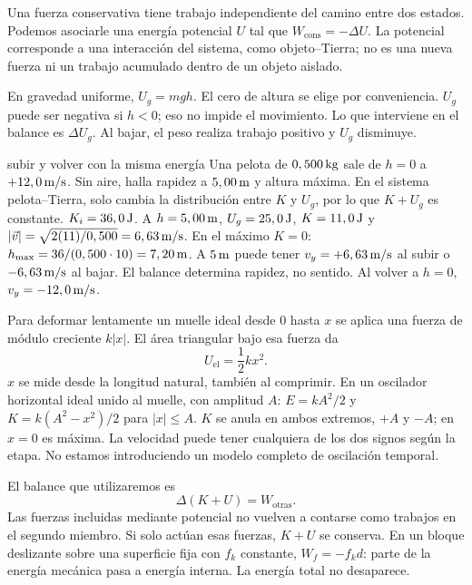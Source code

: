\documentclass[11pt,a4paper]{article}
\begin{document}
Una fuerza conservativa tiene trabajo independiente del camino entre dos estados.
Podemos asociarle una energ\'ia potencial $U$ tal que $W_{\mathrm{cons}}=-\Delta U$.
La potencial corresponde a una interacci\'on del sistema, como objeto--Tierra;
no es una nueva fuerza ni un trabajo acumulado dentro de un objeto aislado.

En gravedad uniforme, $U_g=mgh$. El cero de altura se elige por conveniencia.
$U_g$ puede ser negativa si $h<0$; eso no impide el movimiento.
Lo que interviene en el balance es $\Delta U_g$.
Al bajar, el peso realiza trabajo positivo y $U_g$ disminuye.

\begin{examplebox}{subir y volver con la misma energ\'ia}
 Una pelota de $0,500\,\mathrm{kg}$ sale de $h=0$ a $+12,0\,\mathrm{m/s}$.
Sin aire, halla rapidez a $5,00\,\mathrm{m}$ y altura m\'axima.
\solutionblock
{} En el sistema pelota--Tierra, solo cambia la distribuci\'on
entre $K$ y $U_g$, por lo que $K+U_g$ es constante.
 $K_i=36,0\,\mathrm{J}$.
A $h=5,00\,\mathrm{m}$, $U_g=25,0\,\mathrm{J}$, $K=11,0\,\mathrm{J}$ y
$|\vec v|=\sqrt{2(11)/0,500}=6,63\,\mathrm{m/s}$.
En el m\'aximo $K=0$: $h_{\max}=36/(0,500\cdot10)=7,20\,\mathrm{m}$.
 A $5\,\mathrm{m}$ puede tener $v_y=+6,63\,\mathrm{m/s}$ al subir
o $-6,63\,\mathrm{m/s}$ al bajar. El balance determina rapidez, no sentido.
Al volver a $h=0$, $v_y=-12,0\,\mathrm{m/s}$.
\end{examplebox}

Para deformar lentamente un muelle ideal desde $0$ hasta $x$ se aplica una fuerza
de m\'odulo creciente $k|x|$. El \'area triangular bajo esa fuerza da
\[
U_{\mathrm{el}}=\frac12kx^2.
\]
$x$ se mide desde la longitud natural, tambi\'en al comprimir.
En un oscilador horizontal ideal unido al muelle, con amplitud $A$:
$E=kA^2/2$ y $K=k(A^2-x^2)/2$ para $|x|\le A$.
$K$ se anula en ambos extremos, $+A$ y $-A$; en $x=0$ es m\'axima.
La velocidad puede tener cualquiera de los dos signos seg\'un la etapa.
No estamos introduciendo un modelo completo de oscilaci\'on temporal.

El balance que utilizaremos es
\[
\Delta(K+U)=W_{\mathrm{otras}}.
\]
Las fuerzas incluidas mediante potencial no vuelven a contarse como trabajos en
el segundo miembro. Si solo act\'uan esas fuerzas, $K+U$ se conserva.
En un bloque deslizante sobre una superficie fija con $f_k$ constante,
$W_f=-f_kd$: parte de la energ\'ia mec\'anica pasa a energ\'ia interna.
La energ\'ia total no desaparece.
\end{document}
